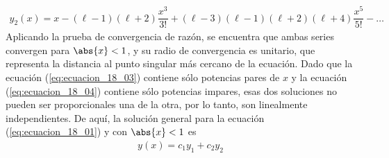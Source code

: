 \begin{align}
y_{2}(x) = x - (\ell - 1)(\ell + 2) \dfrac{x^{3}}{3!} + (\ell - 3) (\ell - 1)(\ell + 2)(\ell + 4) \dfrac{x^{5}}{5!} - \ldots
\label{eq:ecuacion_18_04}
\end{align}
Aplicando la prueba de convergencia de razón, se encuentra que ambas series convergen para $\abs{x} < 1$, y su radio de convergencia es unitario, que representa la distancia al punto singular más cercano de la ecuación. Dado que la ecuación (\ref{eq:ecuacion_18_03}) contiene sólo potencias pares de $x$ y la ecuación (\ref{eq:ecuacion_18_04}) contiene sólo potencias impares, esas dos soluciones no pueden ser proporcionales una de la otra, por lo tanto, son linealmente independientes. De aquí, la solución general para la ecuación (\ref{eq:ecuacion_18_01}) y con $\abs{x} < 1$ es
\begin{align*}
y(x) = c_{1} y_{1} + c_{2} y_{2}
\end{align*}
